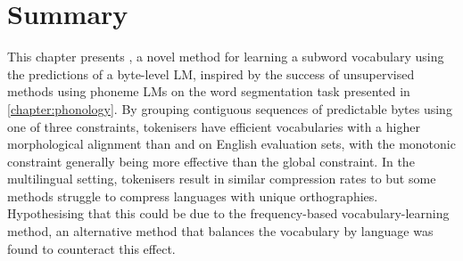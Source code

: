 

\section{Summary}

This chapter presents \tokname, a novel method for learning a subword vocabulary using the predictions of a byte-level LM, inspired by the success of unsupervised methods using phoneme LMs on the word segmentation task presented in \cref{chapter:phonology}. By grouping contiguous sequences of predictable bytes using one of three constraints, \tokname tokenisers have efficient vocabularies with a higher morphological alignment than \bpe and \bpewp on English evaluation sets, with the monotonic constraint generally being more effective than the global constraint. In the multilingual setting, \tokname tokenisers result in similar compression rates to \bpe but some methods struggle to compress languages with unique orthographies. Hypothesising that this could be due to the frequency-based vocabulary-learning method, an alternative method that balances the vocabulary by language was found to counteract this effect.

